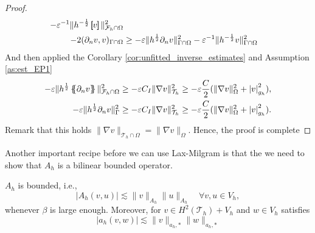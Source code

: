 \begin{proof}
\[\begin{split}
  - \varepsilon ^{-1} \| h^{-\frac{1}{2}} \left[\!\!\left[  v  \right]\!\!\right]   \|_{\mathcal{F} _{h} \cap \Omega   }^{ 2 } \\
- 2 ( \partial _{n} v,v)_{\Gamma \cap \Omega }   &\ge- \varepsilon \| h^{\frac{1}{2}} \partial _{n} v \|_{ \Gamma \cap \Omega  }^{2  }
-  \varepsilon ^{-1} \| h^{-\frac{1}{2}} v \|_{  \Gamma \cap  \Omega }^{ 2 }
     \end{split}
 \]
 And then applied the Corollary \ref{cor:unfitted_inverse_estimates} and Assumption \ref{as:est_EP1} \[
     \begin{split}
         - \varepsilon \| h^{\frac{1}{2}}  \left\{\!\!\left\{  \partial _{n} v\right\}\!\!\right\}      \|_{ \mathcal{F} _{h} \cap \Omega  }^{2  } \ge   - \varepsilon C_{I }  \|\nabla v  \|_{ \mathcal{T}_{h}  }^{2  } \ge -\varepsilon \frac{C}{2} ( \|\nabla v  \|_{ \Omega}^{2} +  \left\lvert 
         v \right\rvert  _{g_{h}  }^{  2}  ),  \\
    - \varepsilon \| h^{\frac{1}{2}}    \partial _{n} v      \|_{ \Gamma   }^{2  } \ge   - \varepsilon C_{I }  \|\nabla v  \|_{ \mathcal{T}_{h}  }^{2  } \ge -\varepsilon \frac{C}{2} ( \|\nabla v  \|_{ \Omega}^{2} +  \left\lvert  v  \right\rvert  _{g_{h}  }^{ 2 }  ). \\
     \end{split}
 \]
 Remark that this holds $\| \nabla v \|_{ \mathcal{T} _{h}\cap \Omega  }^{  }  = \| \nabla v \|_{ \Omega  }^{  } $. Hence, the proof is complete



\end{proof}
Another important recipe before we can use Lax-Milgram is that the we need to show that $A_{h} $ is a bilinear bounded operator.

\begin{lemma}
    $A_{h}$ is bounded, i.e.,
    $$ \left\lvert A_{h}( v,u) \right\rvert \lesssim \| v \|_{A_{h}  }^{  }     \| u \|_{A_{h}  }^{  } \quad  \forall v,u \in V _{h}, $$
    whenever $\beta $ is large enough. Moreover, for $v \in  H^{2}( \mathcal{T}_{h} ) + V_{h} $
    and $w \in V_{h}$ satisfies \[
    \left\lvert a_{h}( v,w) \right\rvert  \lesssim \| v \|_{ a_{h},* }^{  }  \| w \|_{ a_{h},* }^{  }
    \]
\end{lemma}

